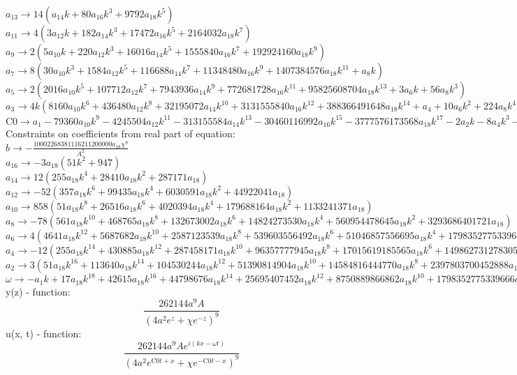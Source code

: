 \documentclass[12pt,a4paper,draft]{article}
\begin{document}
$a_{13}\to 14 \left(a_{14} k+80 a_{16} k^3+9792 a_{18} k^5\right)$\\
$a_{11}\to 4 \left(3 a_{12} k+182 a_{14} k^3+17472 a_{16} k^5+2164032 a_{18} k^7\right)$\\
$a_{9}\to 2 \left(5 a_{10} k+220 a_{12} k^3+16016 a_{14} k^5+1555840 a_{16} k^7+192924160 a_{18} k^9\right)$\\
$a_{7}\to 8 \left(30 a_{10} k^3+1584 a_{12} k^5+116688 a_{14} k^7+11348480 a_{16} k^9+1407384576 a_{18} k^{11}+a_{8} k\right)$\\
$a_{5}\to 2 \left(2016 a_{10} k^5+107712 a_{12} k^7+7943936 a_{14} k^9+772681728 a_{16} k^{11}+95825608704 a_{18} k^{13}+3 a_{6} k+56 a_{8} k^3\right)$\\
$a_{3}\to 4 k \left(8160 a_{10} k^6+436480 a_{12} k^8+32195072 a_{14} k^{10}+3131555840 a_{16} k^{12}+388366491648 a_{18} k^{14}+a_{4}+10 a_{6} k^2+224 a_{8} k^4\right)$\\
$\text{C0}\to a_{1}-79360 a_{10} k^9-4245504 a_{12} k^{11}-313155584 a_{14} k^{13}-30460116992 a_{16} k^{15}-3777576173568 a_{18} k^{17}-2 a_{2} k-8 a_{4} k^3-96 a_{6} k^5-2176 a_{8} k^7$\\
Constraints on coefficients from real part of equation:
\\$b\to -\frac{10002268381116211200000 a_{18} \chi ^9}{A^2}$\\
$a_{16}\to -3 a_{18} \left(51 k^2+947\right)$\\
$a_{14}\to 12 \left(255 a_{18} k^4+28410 a_{18} k^2+287171 a_{18}\right)$\\
$a_{12}\to -52 \left(357 a_{18} k^6+99435 a_{18} k^4+6030591 a_{18} k^2+44922041 a_{18}\right)$\\
$a_{10}\to 858 \left(51 a_{18} k^8+26516 a_{18} k^6+4020394 a_{18} k^4+179688164 a_{18} k^2+1133241371 a_{18}\right)$\\
$a_{8}\to -78 \left(561 a_{18} k^{10}+468765 a_{18} k^8+132673002 a_{18} k^6+14824273530 a_{18} k^4+560954478645 a_{18} k^2+3293686401721 a_{18}\right)$\\
$a_{6}\to 4 \left(4641 a_{18} k^{12}+5687682 a_{18} k^{10}+2587123539 a_{18} k^8+539603556492 a_{18} k^6+51046857556695 a_{18} k^4+1798352775339666 a_{18} k^2+10735592151714901 a_{18}\right)$\\
$a_{4}\to -12 \left(255 a_{18} k^{14}+430885 a_{18} k^{12}+287458171 a_{18} k^{10}+96357777945 a_{18} k^8+17015619185565 a_{18} k^6+1498627312783055 a_{18} k^4+53677960758574505 a_{18} k^2+363571504373287347 a_{18}\right)$\\
$a_{2}\to 3 \left(51 a_{18} k^{16}+113640 a_{18} k^{14}+104530244 a_{18} k^{12}+51390814904 a_{18} k^{10}+14584816444770 a_{18} k^8+2397803700452888 a_{18} k^6+214711843034298020 a_{18} k^4+8725716104958896328 a_{18} k^2+81182355123834396675 a_{18}\right)$\\
$\omega \to -a_{1} k+17 a_{18} k^{18}+42615 a_{18} k^{16}+44798676 a_{18} k^{14}+25695407452 a_{18} k^{12}+8750889866862 a_{18} k^{10}+1798352775339666 a_{18} k^8+214711843034298020 a_{18} k^6+13088574157438344492 a_{18} k^4+243547065371503190025 a_{18} k^2-5669162887825953140625 a_{18}$\\


y(z) - function:
$$
\frac{262144 a^9 A}{\left(4 a^2 e^z+\chi  e^{-z}\right)^9}
$$
u(x, t) - function:
$$
\frac{262144 a^9 A e^{i (k x-\omega  t)}}{\left(4 a^2 e^{\text{C0} t+x}+\chi  e^{-\text{C0} t-x}\right)^9}
$$
\end{document}
